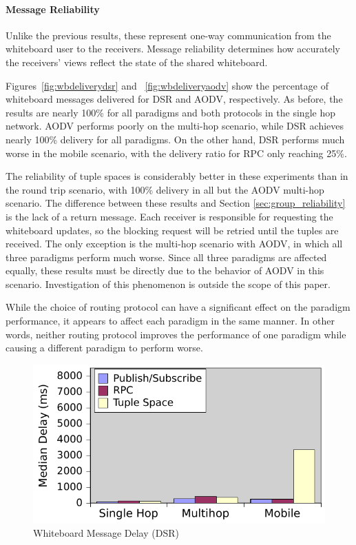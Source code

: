 \paragraph{Message Reliability}

Unlike the previous results, these represent one-way communication from the whiteboard user to the receivers. Message reliability determines how accurately the receivers' views reflect the state of the shared whiteboard.

Figures~\ref{fig:wbdeliverydsr} and ~\ref{fig:wbdeliveryaodv} show the percentage of whiteboard messages delivered for DSR and AODV, respectively. As before, the results are nearly 100\% for all paradigms and both protocols in the single hop network. AODV performs poorly on the multi-hop scenario, while DSR achieves nearly 100\% delivery for all paradigms. On the other hand, DSR performs much worse in the mobile scenario, with the delivery ratio for RPC only reaching 25\%.

The reliability of tuple spaces is considerably better in these experiments than in the round trip scenario, with 100\% delivery in all but the AODV multi-hop scenario. The difference between these results and Section \ref{sec:group_reliability} is the lack of a return message. Each receiver is responsible for requesting the whiteboard updates, so the blocking request will be retried until the tuples are received. The only exception is the multi-hop scenario with AODV, in which all three paradigms perform much worse. Since all three paradigms are affected equally, these results must be directly due to the behavior of AODV in this scenario. Investigation of this phenomenon is outside the scope of this paper.

While the choice of routing protocol can have a significant effect on the paradigm performance, it appears to affect each paradigm in the same manner. In other words, neither routing protocol improves the performance of one paradigm while causing a different paradigm to perform worse.

\begin{figure}
\centering
\includegraphics[scale = 1, clip, trim = 6px 0px 4px 3px]{figures/wb-dsr-delay.pdf}
\caption{Whiteboard Message Delay (DSR)}
\label{fig:wbdelaydsr}
\end{figure}

